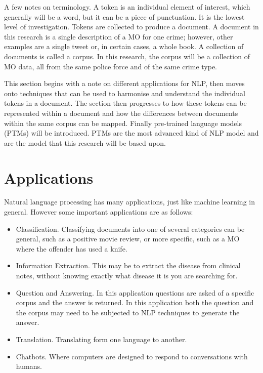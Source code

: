 A few notes on terminology. A token is an individual element of interest, which generally will be a word, but it can be a piece of punctuation. It is the lowest level of investigation. Tokens are collected to produce a document. A document in this research is a single description of a MO for one crime; however, other examples are a single tweet or, in certain cases, a whole book. A collection of documents is called a corpus. In this research, the corpus will be a collection of MO data, all from the same police force and of the same crime type.

This section begins with a note on different applications for NLP, then moves onto techniques that can be used to harmonise and understand the individual tokens in a document. The section then progresses to how these tokens can be represented within a document and how the differences between documents within the same corpus can be mapped. Finally pre-trained language models (PTMs) will be introduced. PTMs are the most advanced kind of NLP model and are the model that this research will be based upon.

\section{Applications}

Natural language processing has many applications, just like machine learning in general. However some important applications are as follows:

\begin{itemize}

\item{Classification.} Classifying documents into one of several categories can be general, such as a positive movie review, or more specific, such as a MO where the offender has used a knife.

\item{Information Extraction.} This may be to extract the disease from clinical notes, without knowing exactly what disease it is you are searching for.

\item{Question and Answering.} In this application questions are asked of a specific corpus and the answer is returned. In this application both the question and the corpus may need to be subjected to NLP techniques to generate the answer.

\item{Translation.} Translating form one language to another.

\item{Chatbots.} Where computers are designed to respond to conversations with humans.

\end{itemize}

